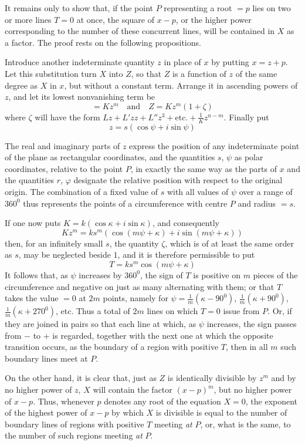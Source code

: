 
It remains only to show that, if the point $P$ representing a root $=p$ lies on two or more lines $T=0$ at once, the square of $x-p$, or the higher power corresponding to the number of these concurrent lines, will be contained in $X$ as a factor. The proof rests on the following propositions.

Introduce another indeterminate quantity $z$ in place of $x$ by putting \mbox{$x=z+p$}. Let this substitution turn $X$ into $Z$, so that $Z$ is a function of $z$ of the same degree as $X$ in $x$, but without a constant term. Arrange it in ascending powers of $z$, and let its lowest nonvanishing term be
\[
=Kz^m\quad\mbox{and}\quad Z=Kz^m(1+\zeta)
\]
where $\zeta$ will have the form $Lz+L'zz+L''z^3+\mbox{etc.}+\frac{1}{K}z^{n-m}$. Finally put
\[
z=s(\cos\psi+i\sin\psi)
\]

The real and imaginary parts of $z$ express the position of any indeterminate point of the plane as rectangular coordinates, and the quantities $s$, $\psi$ as polar coordinates, relative to the point $P$, in exactly the same way as the parts of $x$ and the quantities $r$, $\varphi$ designate the relative position with respect to the original origin. The combination of a fixed value of $s$ with all values of $\psi$ over a range of $360^0$ thus represents the points of a circumference with centre $P$ and radius $=s$.

If one now puts $K=k(\cos\kappa+i\sin\kappa)$, and consequently
\[
Kz^m=ks^m(\cos(m\psi+\kappa)+i\sin(m\psi+\kappa))
\]
then, for an infinitely small $s$, the quantity $\zeta$, which is of at least the same order as $s$, may be neglected beside $1$, and it is therefore permissible to put
\[
T=ks^m\cos(m\psi+\kappa)
\]
It follows that, as $\psi$ increases by $360^0$, the sign of $T$ is positive on $m$ pieces of the circumference and negative on just as many alternating with them; or that $T$ takes the value $=0$ at $2m$ points, namely for $\psi=\frac{1}{m}(\kappa-90^0)$, $\frac{1}{m}(\kappa+90^0)$, $\frac{1}{m}(\kappa+270^0)$, etc. Thus a total of $2m$ lines on which $T=0$ issue from $P$. Or, if they are joined in pairs so that each line at which, as $\psi$ increases, the sign passes from $-$ to $+$ is regarded, together with the next one at which the opposite transition occurs, as the boundary of a region with positive $T$, then in all $m$ such boundary lines meet at $P$.

On the other hand, it is clear that, just as $Z$ is identically divisible by $z^m$ and by no higher power of $z$, $X$ will contain the factor $(x-p)^m$, but no higher power of $x-p$. Thus, whenever $p$ denotes any root of the equation $X=0$, the exponent of the highest power of $x-p$ by which $X$ is divisible is equal to the number of boundary lines of regions with positive $T$ meeting \emph{at} $P$, or, what is the same, to the number of such regions meeting \emph{at} $P$.

